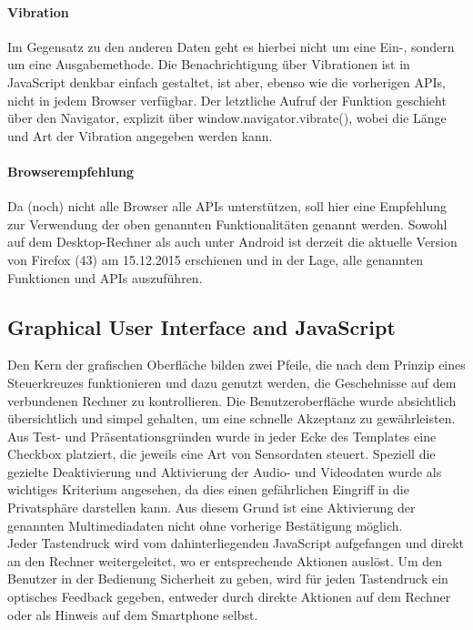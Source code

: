 \documentclass[a4paper]{spie}  %
\begin{document}
\paragraph{Vibration}
Im Gegensatz zu den anderen Daten geht es hierbei nicht um eine Ein-, sondern um eine Ausgabemethode. Die Benachrichtigung über Vibrationen ist in JavaScript denkbar einfach gestaltet, ist aber, ebenso wie die vorherigen APIs, nicht in jedem Browser verfügbar. Der letztliche Aufruf der Funktion geschieht über den Navigator, explizit über window.navigator.vibrate(), wobei die Länge und Art der Vibration angegeben werden kann.

\paragraph{Browserempfehlung}
Da (noch) nicht alle Browser alle APIs unterstützen, soll hier eine Empfehlung zur Verwendung der oben genannten Funktionalitäten genannt werden. Sowohl auf dem Desktop-Rechner als auch unter Android ist derzeit die aktuelle Version von Firefox (43) am 15.12.2015 erschienen und in der Lage, alle genannten Funktionen und APIs auszuführen.

\subsection{Graphical User Interface and JavaScript} %

Den Kern der grafischen Oberfläche bilden zwei Pfeile, die nach dem Prinzip eines Steuerkreuzes funktionieren und dazu genutzt werden, die Geschehnisse auf dem verbundenen Rechner zu kontrollieren. Die Benutzeroberfläche wurde absichtlich übersichtlich und simpel gehalten, um eine schnelle Akzeptanz zu gewährleisten. Aus Test- und Präsentationsgründen wurde in jeder Ecke des Templates eine Checkbox platziert, die jeweils eine Art von Sensordaten steuert. Speziell die gezielte Deaktivierung und Aktivierung der Audio- und Videodaten wurde als wichtiges Kriterium angesehen, da dies einen gefährlichen Eingriff in die Privatsphäre darstellen kann. Aus diesem Grund ist eine Aktivierung der genannten Multimediadaten nicht ohne vorherige Bestätigung möglich. \\
Jeder Tastendruck wird vom dahinterliegenden JavaScript aufgefangen und direkt an den Rechner weitergeleitet, wo er entsprechende Aktionen auslöst. Um den Benutzer in der Bedienung Sicherheit zu geben, wird für jeden Tastendruck ein optisches Feedback gegeben, entweder durch direkte Aktionen auf dem Rechner oder als Hinweis auf dem Smartphone selbst.
\end{document}
